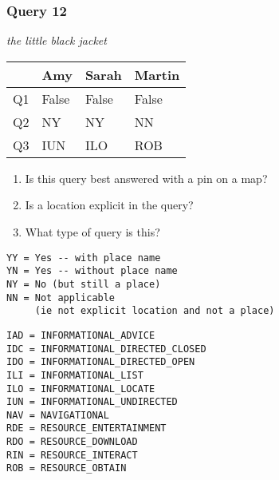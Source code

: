 \begin{frame}[fragile]
\frametitle{Query 12}
\vspace{1em}

\emph{the little black jacket}

\vfill

\begin{table}
  \centering
  \begin{tabular}{ l l l l }
    & \textbf{Amy} & \textbf{Sarah} & \textbf{Martin}\\
    \toprule
    Q1 & False & False & False\\
Q2 & NY & NY & NN\\
Q3 & IUN & ILO & ROB\\
    \bottomrule
  \end{tabular}
\end{table}

\vfill

\tiny{

\begin{enumerate}
\item Is this query best answered with a pin on a map?
\item Is a location explicit in the query?
\item What type of query is this?
\end{enumerate}

\vfill

\begin{multicols}{2}
\begin{verbatim}
YY = Yes -- with place name
YN = Yes -- without place name
NY = No (but still a place)
NN = Not applicable 
     (ie not explicit location and not a place)
\end{verbatim}

\columnbreak
\begin{verbatim}
IAD = INFORMATIONAL_ADVICE
IDC = INFORMATIONAL_DIRECTED_CLOSED
IDO = INFORMATIONAL_DIRECTED_OPEN
ILI = INFORMATIONAL_LIST
ILO = INFORMATIONAL_LOCATE
IUN = INFORMATIONAL_UNDIRECTED
NAV = NAVIGATIONAL
RDE = RESOURCE_ENTERTAINMENT
RDO = RESOURCE_DOWNLOAD
RIN = RESOURCE_INTERACT
ROB = RESOURCE_OBTAIN
\end{verbatim}
\end{multicols}
}

\end{frame}


